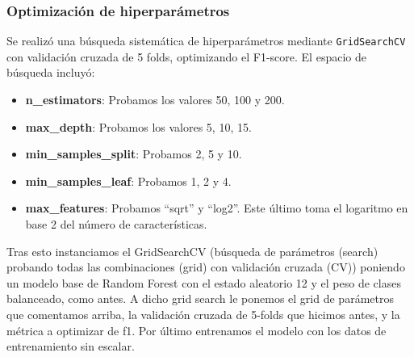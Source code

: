 \subsubsection*{Optimización de hiperparámetros}

Se realizó una búsqueda sistemática de hiperparámetros mediante \texttt{GridSearchCV} con validación cruzada de 5 folds, optimizando el F1-score. El espacio de búsqueda incluyó:

\begin{itemize}
	\item \textbf{n_estimators}: Probamos los valores 50, 100 y 200.
	\item \textbf{max_depth}: Probamos los valores 5, 10, 15.
	\item \textbf{min_samples_split}: Probamos 2, 5 y 10.
	\item \textbf{min_samples_leaf}: Probamos 1, 2 y 4.
	\item \textbf{max_features}: Probamos ``sqrt'' y ``log2''. Este último toma el logaritmo en base 2 del número de características.
\end{itemize}

Tras esto instanciamos el GridSearchCV (búsqueda de parámetros (search) probando todas las combinaciones (grid) con validación cruzada (CV)) poniendo un modelo base de Random Forest con el estado aleatorio 12 y el peso de clases balanceado, como antes. A dicho grid search le ponemos el grid de parámetros que comentamos arriba, la validación cruzada de 5-folds que hicimos antes, y la métrica a optimizar de f1. Por último entrenamos el modelo con los datos de entrenamiento sin escalar.